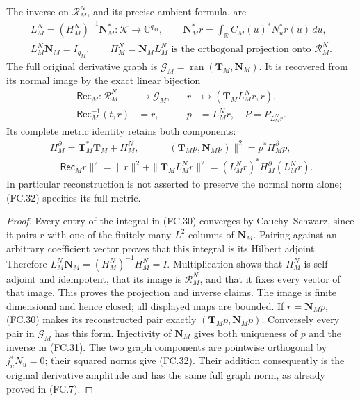 \begin{theorem}
The inverse on \(\mathscr R_M^N\), and its precise ambient formula,
are
\[
 \begin{gathered}
 L_M^N=(H_M^N)^{-1}\mathbf N_M^*:\mathscr K\to\mathbb C^{q_M},
 \qquad
 \mathbf N_M^*r=\int_{\mathbb R}C_M(u)^*N_u^*r(u)\,du,\\
 L_M^N\mathbf N_M=I_{q_M},\qquad
 \Pi_M^N=\mathbf N_ML_M^N
      \text{ is the orthogonal projection onto }\mathscr R_M^N.
 \end{gathered}
 \tag{FC.30}
\]
The full original derivative graph is
\(\mathscr G_M=\operatorname{ran}(\mathbf T_M,\mathbf N_M)\).
It is recovered from its normal image by the exact linear bijection
\[
 \begin{aligned}
 \mathsf{Rec}_M:\mathscr R_M^N&\longrightarrow\mathscr G_M,
       &r&\longmapsto(\mathbf T_ML_M^Nr,r),\\
 \mathsf{Rec}_M^{-1}(t,r)&=r,\qquad
 &p&=L_M^Nr,\quad P=P_{L_M^Nr}.
 \end{aligned}
 \tag{FC.31}
\]
Its complete metric identity retains both components:
\[
 \begin{gathered}
 H_M^{\partial}=\mathbf T_M^*\mathbf T_M+H_M^N,\qquad
 \|(\mathbf T_Mp,\mathbf N_Mp)\|^2=p^*H_M^{\partial}p,\\
 \|\mathsf{Rec}_Mr\|^2
      =\|r\|^2+\|\mathbf T_ML_M^Nr\|^2
      =(L_M^Nr)^*H_M^{\partial}(L_M^Nr).
 \end{gathered}
 \tag{FC.32}
\]
In particular reconstruction is not asserted to preserve the normal
norm alone; (FC.32) specifies its full metric.
\end{theorem}

\begin{proof}
Every entry of the integral in (FC.30) converges by
Cauchy--Schwarz, since it pairs \(r\) with one of the finitely
many \(L^2\) columns of \(\mathbf N_M\). Pairing against an
arbitrary coefficient vector proves that this integral is its
Hilbert adjoint. Therefore
\(L_M^N\mathbf N_M=(H_M^N)^{-1}H_M^N=I\).
Multiplication shows that \(\Pi_M^N\) is self-adjoint and
idempotent, that its image is \(\mathscr R_M^N\), and that it
fixes every vector of that image. This proves the projection and
inverse claims. The image is finite dimensional and hence closed;
all displayed maps are bounded.
If \(r=\mathbf N_Mp\), (FC.30) makes its reconstructed pair
exactly \((\mathbf T_Mp,\mathbf N_Mp)\). Conversely every pair
in \(\mathscr G_M\) has this form. Injectivity of
\(\mathbf N_M\) gives both uniqueness of \(p\) and the inverse
in (FC.31). The two graph components are pointwise orthogonal by
\(j_u^*N_u=0\); their squared norms give (FC.32).
Their addition consequently is the original derivative amplitude
and has the same full graph norm, as already proved in (FC.7).
\end{proof}

